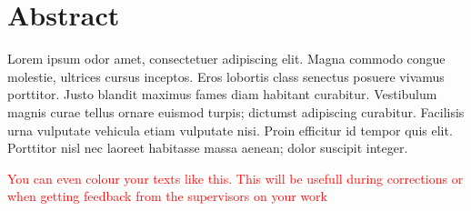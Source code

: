 \begingroup
\let\clearpage\relax
\let\cleardoublepage\relax
\let\cleardoublepage\relax

\chapter*{Abstract}
Lorem ipsum odor amet, consectetuer adipiscing elit. Magna commodo congue molestie, ultrices cursus inceptos. Eros lobortis class senectus posuere vivamus porttitor. Justo blandit maximus fames diam habitant curabitur. Vestibulum magnis curae tellus ornare euismod turpis; dictumst adipiscing curabitur. Facilisis urna vulputate vehicula etiam vulputate nisi. Proin efficitur id tempor quis elit. Porttitor nisl nec laoreet habitasse massa aenean; dolor suscipit integer.


\textcolor{red}{You can even colour your texts like this. This will be usefull during corrections or when getting feedback from the supervisors on your work}

\vfill

\endgroup

\vfill



